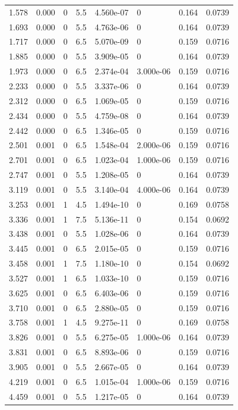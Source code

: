 \documentclass[preview]{standalone}
\begin{document}
{{\begin{tabular}{L{1.2cm}C{1.2cm} C{0.3cm}C{0.5cm} C{1.4cm}C{1.4cm} C{1.4cm}C{1.4cm}}
  1.578  &  0.000  & 0     & 5.5 &  4.560e-07  & 0  & 0.164 &  0.0739   \\ 
  1.693  &  0.000  & 0     & 5.5 &  4.763e-06  & 0  & 0.164 &  0.0739   \\ 
  1.717  &  0.000  & 0     & 6.5 &  5.070e-09  & 0  & 0.159 &  0.0716   \\ 
  1.885  &  0.000  & 0     & 5.5 &  3.909e-05  & 0  & 0.164 &  0.0739   \\ 
  1.973  &  0.000  & 0     & 6.5 &  2.374e-04  & 3.000e-06  & 0.159 &  0.0716   \\ 
  2.233  &  0.000  & 0     & 5.5 &  3.337e-06  & 0  & 0.164 &  0.0739   \\ 
  2.312  &  0.000  & 0     & 6.5 &  1.069e-05  & 0  & 0.159 &  0.0716   \\ 
  2.434  &  0.000  & 0     & 5.5 &  4.759e-08  & 0  & 0.164 &  0.0739   \\ 
  2.442  &  0.000  & 0     & 6.5 &  1.346e-05  & 0  & 0.159 &  0.0716   \\ 
  2.501  &  0.001  & 0     & 6.5 &  1.548e-04  & 2.000e-06  & 0.159 &  0.0716   \\ 
  2.701  &  0.001  & 0     & 6.5 &  1.023e-04  & 1.000e-06  & 0.159 &  0.0716   \\ 
  2.747  &  0.001  & 0     & 5.5 &  1.208e-05  & 0  & 0.164 &  0.0739   \\ 
  3.119  &  0.001  & 0     & 5.5 &  3.140e-04  & 4.000e-06  & 0.164 &  0.0739   \\ 
  3.253  &  0.001  & 1     & 4.5 &  1.494e-10  & 0  & 0.169 &  0.0758   \\ 
  3.336  &  0.001  & 1     & 7.5 &  5.136e-11  & 0  & 0.154 &  0.0692   \\ 
  3.438  &  0.001  & 0     & 5.5 &  1.028e-06  & 0  & 0.164 &  0.0739   \\ 
  3.445  &  0.001  & 0     & 6.5 &  2.015e-05  & 0  & 0.159 &  0.0716   \\ 
  3.458  &  0.001  & 1     & 7.5 &  1.180e-10  & 0  & 0.154 &  0.0692   \\ 
  3.527  &  0.001  & 1     & 6.5 &  1.033e-10  & 0  & 0.159 &  0.0716   \\ 
  3.625  &  0.001  & 0     & 6.5 &  6.403e-06  & 0  & 0.159 &  0.0716   \\ 
  3.710  &  0.001  & 0     & 6.5 &  2.880e-05  & 0  & 0.159 &  0.0716   \\ 
  3.758  &  0.001  & 1     & 4.5 &  9.275e-11  & 0  & 0.169 &  0.0758   \\ 
  3.826  &  0.001  & 0     & 5.5 &  6.275e-05  & 1.000e-06  & 0.164 &  0.0739   \\ 
  3.831  &  0.001  & 0     & 6.5 &  8.893e-06  & 0  & 0.159 &  0.0716   \\ 
  3.905  &  0.001  & 0     & 5.5 &  2.667e-05  & 0  & 0.164 &  0.0739   \\ 
  4.219  &  0.001  & 0     & 6.5 &  1.015e-04  & 1.000e-06  & 0.159 &  0.0716   \\ 
  4.459  &  0.001  & 0     & 5.5 &  1.217e-05  & 0  & 0.164 &  0.0739   \\ 
\hline 
\end{tabular} 

}}
\end{document}
